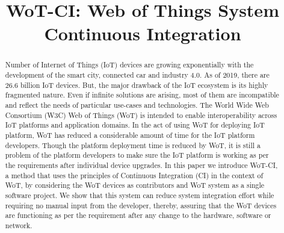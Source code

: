 \documentclass[conference]{IEEEtran}
\theoremstyle{definition}
\begin{document}
\title{WoT-CI: Web of Things System Continuous Integration \\
}

\author{
  \and
  \and
}

\maketitle
 


\begin{abstract}

  Number of Internet of Things (IoT) devices are growing exponentially with the development of the smart city, connected car and industry 4.0.
  As of 2019, there are 26.6 billion IoT devices. 
  But, the major drawback of the IoT ecosystem is its highly fragmented nature. 
  Even if infinite solutions are arising, most of them are incompatible and reflect the needs of particular use-cases and technologies. 
  The World Wide Web Consortium (W3C) Web of Things (WoT) is intended to enable interoperability across IoT platforms and application domains. 
  In the act of using WoT for deploying IoT platform, WoT has reduced a considerable amount of time for the IoT platform developers. 
  Though the platform deployment time is reduced by WoT, it is still a problem of the platform developers to make sure the IoT platform is working as per the requirements after individual device upgrades.  
  In this paper we introduce WoT-CI, a method that uses the principles of Continuous Integration (CI) in the context of WoT, by considering the WoT devices as contributors and WoT system as a single software project. We show that this system can reduce system integration effort while requiring no manual input from the developer, thereby, assuring that the WoT devices are functioning as per the requirement after any change to the hardware, software or network.


\end{abstract}
\end{document}
